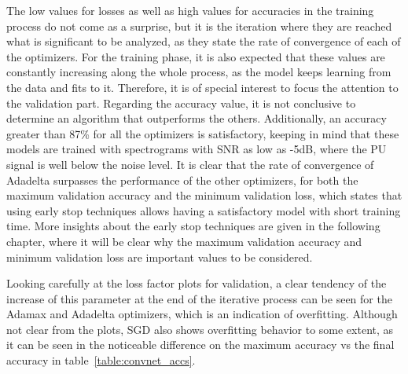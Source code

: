 The low values for losses as well as high values for accuracies in the training process do not come as a surprise, but it is the iteration where they are reached what is significant to be analyzed, as they state the rate of convergence of each of the optimizers. For the training phase, it is also expected that these values are constantly increasing along the whole process, as the model keeps learning from the data and fits to it. Therefore, it is of special interest to focus the attention to the validation part. Regarding the accuracy value, it is not conclusive to determine an algorithm that outperforms the others. Additionally, an accuracy greater than 87\% for all the optimizers is satisfactory, keeping in mind that these models are trained with spectrograms with SNR as low as -5dB, where the \ac{PU} signal is well below the noise level. It is clear that the rate of convergence of Adadelta surpasses the performance of the other optimizers, for both the maximum validation accuracy and the minimum validation loss, which states that using early stop techniques allows having a satisfactory model with short training time. More insights about the early stop techniques are given in the following chapter, where it will be clear why the maximum validation accuracy and minimum validation loss are important values to be considered.

Looking carefully at the loss factor plots for validation, a clear tendency of the increase of this parameter at the end of the iterative process can be seen for the Adamax and Adadelta optimizers, which is an indication of overfitting. Although not clear from the plots, SGD also shows overfitting behavior to some extent, as it can be seen in the noticeable difference on the maximum accuracy vs the final accuracy in table~\ref{table:convnet_accs}.

